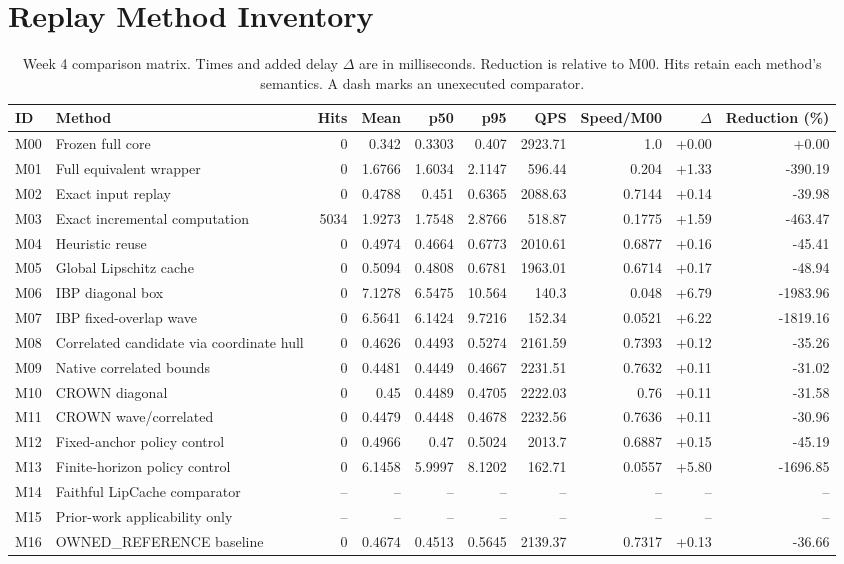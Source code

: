 \section{Replay Method Inventory}
\begin{table}[H]
\caption{Week 4 comparison matrix. Times and added delay $\Delta$ are in milliseconds. Reduction is relative to M00. Hits retain each method's semantics. A dash marks an unexecuted comparator.}
\centering\small
\begin{tabularx}{\textwidth}{@{}lYrrrrrrrr@{}}\toprule
ID & Method & Hits & Mean & p50 & p95 & QPS & Speed/M00 & $\Delta$ & Reduction (\%) \\
\midrule
M00 & Frozen full core & 0 & 0.342 & 0.3303 & 0.407 & 2923.71 & 1.0 & +0.00 & +0.00 \\
M01 & Full equivalent wrapper & 0 & 1.6766 & 1.6034 & 2.1147 & 596.44 & 0.204 & +1.33 & -390.19 \\
M02 & Exact input replay & 0 & 0.4788 & 0.451 & 0.6365 & 2088.63 & 0.7144 & +0.14 & -39.98 \\
M03 & Exact incremental computation & 5034 & 1.9273 & 1.7548 & 2.8766 & 518.87 & 0.1775 & +1.59 & -463.47 \\
M04 & Heuristic reuse & 0 & 0.4974 & 0.4664 & 0.6773 & 2010.61 & 0.6877 & +0.16 & -45.41 \\
M05 & Global Lipschitz cache & 0 & 0.5094 & 0.4808 & 0.6781 & 1963.01 & 0.6714 & +0.17 & -48.94 \\
M06 & IBP diagonal box & 0 & 7.1278 & 6.5475 & 10.564 & 140.3 & 0.048 & +6.79 & -1983.96 \\
M07 & IBP fixed-overlap wave & 0 & 6.5641 & 6.1424 & 9.7216 & 152.34 & 0.0521 & +6.22 & -1819.16 \\
M08 & Correlated candidate via coordinate hull & 0 & 0.4626 & 0.4493 & 0.5274 & 2161.59 & 0.7393 & +0.12 & -35.26 \\
M09 & Native correlated bounds & 0 & 0.4481 & 0.4449 & 0.4667 & 2231.51 & 0.7632 & +0.11 & -31.02 \\
M10 & CROWN diagonal & 0 & 0.45 & 0.4489 & 0.4705 & 2222.03 & 0.76 & +0.11 & -31.58 \\
M11 & CROWN wave/correlated & 0 & 0.4479 & 0.4448 & 0.4678 & 2232.56 & 0.7636 & +0.11 & -30.96 \\
M12 & Fixed-anchor policy control & 0 & 0.4966 & 0.47 & 0.5024 & 2013.7 & 0.6887 & +0.15 & -45.19 \\
M13 & Finite-horizon policy control & 0 & 6.1458 & 5.9997 & 8.1202 & 162.71 & 0.0557 & +5.80 & -1696.85 \\
M14 & Faithful LipCache comparator & -- & -- & -- & -- & -- & -- & -- & -- \\
M15 & Prior-work applicability only & -- & -- & -- & -- & -- & -- & -- & -- \\
M16 & OWNED\_REFERENCE baseline & 0 & 0.4674 & 0.4513 & 0.5645 & 2139.37 & 0.7317 & +0.13 & -36.66 \\
\bottomrule\end{tabularx}
\end{table}
